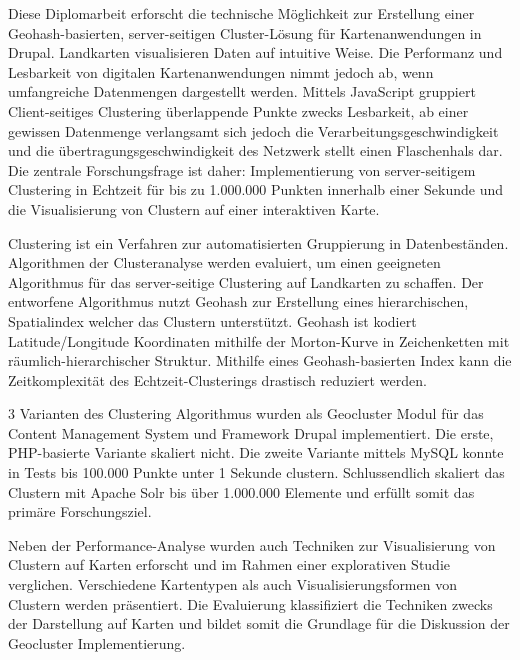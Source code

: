Diese Diplomarbeit erforscht die technische M\"{o}glichkeit zur Erstellung einer Geohash-basierten, server-seitigen Cluster-L\"{o}sung f\"{u}r Kartenanwendungen in Drupal. Landkarten visualisieren Daten auf intuitive Weise. Die Performanz und Lesbarkeit von digitalen Kartenanwendungen nimmt jedoch ab, wenn umfangreiche Datenmengen dargestellt werden. Mittels JavaScript gruppiert Client-seitiges Clustering \"{u}berlappende Punkte zwecks Lesbarkeit, ab einer gewissen Datenmenge verlangsamt sich jedoch die Verarbeitungsgeschwindigkeit und die \"{u}bertragungsgeschwindigkeit des Netzwerk stellt einen Flaschenhals dar. Die zentrale Forschungsfrage ist daher: Implementierung von server-seitigem Clustering in Echtzeit f\"{u}r bis zu 1.000.000 Punkten innerhalb einer Sekunde und die Visualisierung von Clustern auf einer interaktiven Karte.

Clustering ist ein Verfahren zur automatisierten Gruppierung in Datenbest\"{a}nden. Algorithmen der Clusteranalyse werden evaluiert, um einen geeigneten Algorithmus f\"{u}r das server-seitige Clustering auf Landkarten zu schaffen. Der entworfene Algorithmus nutzt Geohash zur Erstellung eines hierarchischen, Spatialindex welcher das Clustern unterst\"{u}tzt. Geohash ist kodiert Latitude/Longitude Koordinaten mithilfe der Morton-Kurve in Zeichenketten mit r\"{a}umlich-hierarchischer Struktur. Mithilfe eines Geohash-basierten Index kann die Zeitkomplexit\"{a}t des Echtzeit-Clusterings drastisch reduziert werden.

3 Varianten des Clustering Algorithmus wurden als Geocluster Modul f\"{u}r das Content Management System und Framework Drupal implementiert. Die erste, PHP-basierte Variante skaliert nicht. Die zweite Variante mittels MySQL konnte in Tests bis 100.000 Punkte unter 1 Sekunde clustern. Schlussendlich skaliert das Clustern mit Apache Solr bis \"{u}ber 1.000.000 Elemente und erf\"{u}llt somit das prim\"{a}re Forschungsziel.

Neben der Performance-Analyse wurden auch Techniken zur Visualisierung von Clustern auf Karten erforscht und im Rahmen einer explorativen Studie verglichen. Verschiedene Kartentypen als auch Visualisierungsformen von Clustern werden pr\"{a}sentiert. Die Evaluierung klassifiziert die Techniken zwecks der Darstellung auf Karten und bildet somit die Grundlage f\"{u}r die Diskussion der Geocluster Implementierung.  